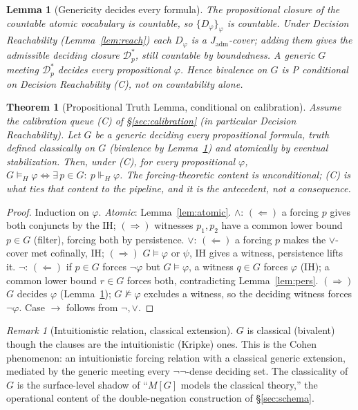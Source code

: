 \documentclass[11pt]{article}
\newtheorem{theorem}{Theorem}
\newtheorem{lemma}{Lemma}
\theoremstyle{definition}
\theoremstyle{remark}
\newtheorem*{remark}{Remark}
\newcommand{\forcesH}{\Vdash_{H}}
\newcommand{\Jadm}{J_{\mathrm{adm}}}
\begin{document}
\begin{lemma}[Genericity decides every formula]\label{lem:bivalence}
The propositional closure of the countable atomic vocabulary is countable, so $\{D_\varphi\}_\varphi$
is countable. Under Decision Reachability (Lemma~\ref{lem:reach}) each $D_\varphi$ is a $\Jadm$-cover;
adding them gives the admissible deciding closure $\mathcal{D}_p^\ast$, still countable by boundedness.
A generic $G$ meeting $\mathcal{D}_p^\ast$ decides every propositional $\varphi$. \emph{Hence bivalence
on $G$ is P conditional on Decision Reachability (C), not on countability alone.}
\end{lemma}

\begin{theorem}[Propositional Truth Lemma, conditional on calibration]\label{thm:prop}
Assume the calibration queue \emph{(C)} of \S\ref{sec:calibration} (in particular Decision
Reachability). Let $G$ be a generic deciding every propositional formula, truth defined classically on
$G$ (bivalence by Lemma~\ref{lem:bivalence}) and atomically by eventual stabilization. Then, under
(C), for every propositional $\varphi$,
$G\models_H\varphi \iff \exists\,p\in G:\ p\forcesH\varphi$.
The forcing-theoretic content is unconditional; (C) is what ties that content to the pipeline, and it
is the antecedent, not a consequence.
\end{theorem}
\begin{proof}
Induction on $\varphi$. \emph{Atomic}: Lemma~\ref{lem:atomic}. \emph{$\wedge$}: $(\Leftarrow)$ a
forcing $p$ gives both conjuncts by the IH; $(\Rightarrow)$ witnesses $p_1,p_2$ have a common lower
bound $p\in G$ (filter), forcing both by persistence. \emph{$\vee$}: $(\Leftarrow)$ a forcing $p$
makes the $\vee$-cover met cofinally, IH; $(\Rightarrow)$ $G\models\varphi$ or $\psi$, IH gives a
witness, persistence lifts it. \emph{$\neg$}: $(\Leftarrow)$ if $p\in G$ forces $\neg\varphi$ but
$G\models\varphi$, a witness $q\in G$ forces $\varphi$ (IH); a common lower bound $r\in G$ forces both,
contradicting Lemma~\ref{lem:pers}. $(\Rightarrow)$ $G$ decides $\varphi$ (Lemma~\ref{lem:bivalence});
$G\not\models\varphi$ excludes a witness, so the deciding witness forces $\neg\varphi$. Case $\to$
follows from $\neg,\vee$.
\end{proof}

\begin{remark}[Intuitionistic relation, classical extension]
$G$ is classical (bivalent) though the clauses are the intuitionistic (Kripke) ones. This is the
Cohen phenomenon: an intuitionistic forcing relation with a classical generic extension, mediated by
the generic meeting every $\neg\neg$-dense deciding set. The classicality of $G$ is the surface-level
shadow of ``$M[G]$ models the classical theory,'' the operational content of the double-negation
construction of \S\ref{sec:schema}.
\end{remark}
\end{document}
